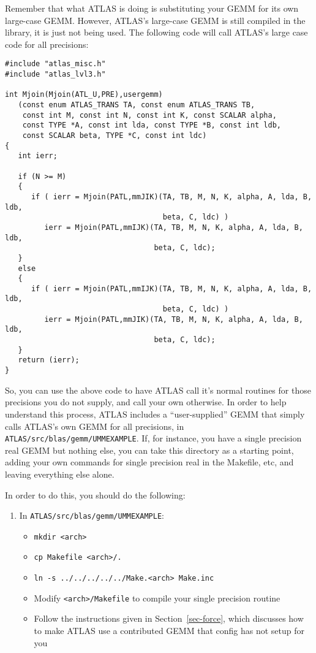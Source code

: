 \documentclass[11pt]{article}
\begin{document}
Remember that what ATLAS is doing is substituting your GEMM for its own
large-case GEMM.  However, ATLAS's large-case GEMM is still compiled in
the library, it is just not being used.  The following code will call
ATLAS's large case code for all precisions:
\begin{verbatim}
#include "atlas_misc.h"
#include "atlas_lvl3.h"

int Mjoin(Mjoin(ATL_U,PRE),usergemm)
   (const enum ATLAS_TRANS TA, const enum ATLAS_TRANS TB,
    const int M, const int N, const int K, const SCALAR alpha,
    const TYPE *A, const int lda, const TYPE *B, const int ldb,
    const SCALAR beta, TYPE *C, const int ldc)
{
   int ierr;

   if (N >= M)
   {
      if ( ierr = Mjoin(PATL,mmJIK)(TA, TB, M, N, K, alpha, A, lda, B, ldb,
                                    beta, C, ldc) )
         ierr = Mjoin(PATL,mmIJK)(TA, TB, M, N, K, alpha, A, lda, B, ldb,
                                  beta, C, ldc);
   }
   else
   {
      if ( ierr = Mjoin(PATL,mmIJK)(TA, TB, M, N, K, alpha, A, lda, B, ldb,
                                    beta, C, ldc) )
         ierr = Mjoin(PATL,mmJIK)(TA, TB, M, N, K, alpha, A, lda, B, ldb,
                                  beta, C, ldc);
   }
   return (ierr);
}
\end{verbatim}

So, you can use the above code to have ATLAS call it's normal routines
for those precisions you do not supply, and call your own otherwise.
In order to help understand this process, ATLAS includes a 
``user-supplied'' GEMM that simply calls ATLAS's own GEMM for all
precisions, in {\tt ATLAS/src/blas/gemm/UMMEXAMPLE}.  If, for
instance, you have a single precision real GEMM but nothing else,
you can take this directory as a starting point, adding your
own commands for single precision real in the Makefile, etc,
and leaving everything else alone.

In order to do this, you should do the following:
\begin{enumerate}
\item In {\tt ATLAS/src/blas/gemm/UMMEXAMPLE}:
   \begin{itemize}
   \item {\tt mkdir <arch>}
   \item {\tt cp Makefile <arch>/.}
   \item {\tt ln -s ../../../../../Make.<arch> Make.inc}
   \item Modify {\tt <arch>/Makefile} to compile your single precision routine
   \item Follow the instructions given in Section~\ref{sec-force},
which discusses how to make ATLAS use a contributed GEMM that config
has not setup for you
   \end{itemize}
\end{enumerate}
\end{document}
